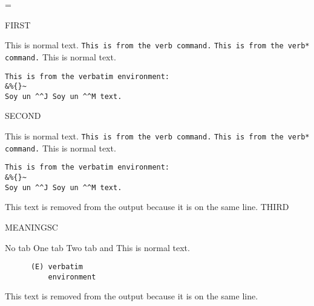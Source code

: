 \documentclass{article}
\begin{document}
\par
{}\par
{}\par
{}\par
{}\par
{}\par
{}\par
{}\par

\edef\tmpa{\the\interactionmode}
\scrollmode
{}
\interactionmode=\tmpa

FIRST\par
This ^^J is normal ^^J text.
\verb|This is from the verb command.|
\verb*|This is from the verb* command.|
This is normal text.
\begin{verbatim}
This is from the verbatim environment:
&%{}~
Soy un ^^J Soy un ^^M text.
\end{verbatim}

SECOND\par
\begin{scontents}[store-env=newattempt,print-env=true]
This ^^J is normal ^^J text.
\verb|This is from the verb command.|
\verb*|This is from the verb* command.|
This is normal text.
\begin{verbatim}
This is from the verbatim environment:
&%{}~
Soy un ^^J Soy un ^^M text.
\end{verbatim}
\end{scontents}This text is removed from the output because it is on the same line.
THIRD\par
\par

MEANINGSC\par
{}\par
\begin{scontents}[write-out=withtab.tsc]
No tab
	One tab
		Two tab and
		This ^^J is normal ^^J text.
\begin{verbatim}
      (E) verbatim
          environment
\end{verbatim}
\end{scontents}This text is removed from the output because it is on the same line.
\end{document}
